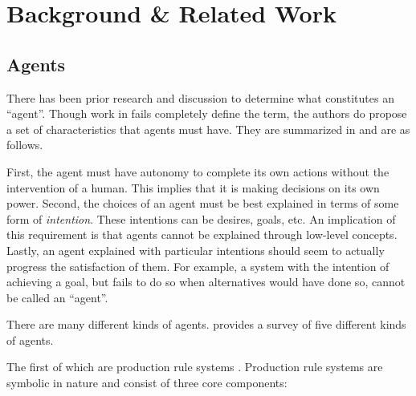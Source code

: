 \chapter{Background \& Related Work}

%
%
%

\section{Agents}

There has been prior research and discussion to determine what constitutes an ``agent''.
Though work in \cite{wooldridge_agent_1995} fails completely define the term,
the authors do propose a set of characteristics that agents must have.
They are summarized in \cite{dignum_intentional_1998} and are as follows.

First, the agent must have autonomy to complete its own actions without the intervention of a human.
This implies that it is making decisions on its own power.
Second, the choices of an agent must be best explained in terms of some form of \textit{intention}.
These intentions can be desires, goals, etc.
An implication of this requirement is that agents cannot be explained through low-level concepts.
Lastly, an agent explained with particular intentions should seem to actually progress the satisfaction of them.
For example, a system with the intention of achieving a goal,
but fails to do so when alternatives would have done so, cannot be called an ``agent''.

There are many different kinds of agents.
\cite{balke_how_2014} provides a survey of five different kinds of agents.

The first of which are production rule systems \cite{balke_how_2014}.
Production rule systems are symbolic in nature and
consist of three core components:

